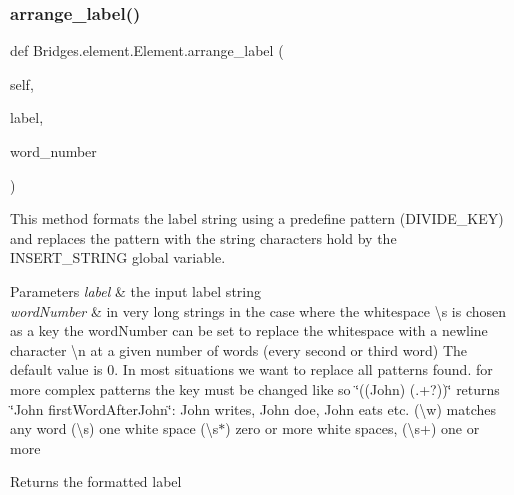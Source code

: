 \mbox{\label{class_bridges_1_1element_1_1_element_a17f4120ec937cee6779aaa9f2139d3a7}} 
\subsubsection{\texorpdfstring{arrange\+\_\+label()}{arrange\_label()}}
{\footnotesize\ttfamily def Bridges.\+element.\+Element.\+arrange\+\_\+label (\begin{DoxyParamCaption}\item[{}]{self,  }\item[{}]{label,  }\item[{}]{word\+\_\+number }\end{DoxyParamCaption})}



This method formats the label string using a predefine pattern (D\+I\+V\+I\+D\+E\+\_\+\+K\+EY) and replaces the pattern with the string characters hold by the I\+N\+S\+E\+R\+T\+\_\+\+S\+T\+R\+I\+NG global variable. 


\begin{DoxyParams}{Parameters}
{\em label} & the input label string\\
\hline
{\em word\+Number} & in very long strings in the case where the whitespace \textbackslash{}s is chosen as a key the word\+Number can be set to replace the whitespace with a newline character \textbackslash{}n at a given number of words (every second or third word) The default value is 0. In most situations we want to replace all patterns found. for more complex patterns the key must be changed like so \char`\"{}((\+John) (.+?))\char`\"{} returns \char`\"{}\+John first\+Word\+After\+John\char`\"{}\+: John writes, John doe, John eats etc. (\textbackslash{}w) matches any word (\textbackslash{}s) one white space (\textbackslash{}s$\ast$) zero or more white spaces, (\textbackslash{}s+) one or more\\
\hline
\end{DoxyParams}
\begin{DoxyReturn}{Returns}
the formatted label 
\end{DoxyReturn}
\mbox{\label{class_bridges_1_1element_1_1_element_ade4aee8d863fcb0233d1f1f659b1c0a6}} 
